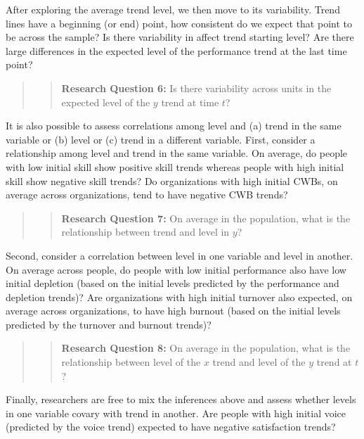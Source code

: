 \documentclass[english,,man]{apa6}
\begin{document}
After exploring the average trend level, we then move to its variability. Trend lines have a beginning (or end) point, how consistent do we expect that point to be across the sample? Is there variability in affect trend starting level? Are there large differences in the expected level of the performance trend at the last time point?

\begin{quote}
\begin{quote}
\textbf{Research Question 6:} Is there variability across units in the expected level of the \(y\) trend at time \(t\)?
\end{quote}
\end{quote}

It is also possible to assess correlations among level and (a) trend in the same variable or (b) level or (c) trend in a different variable. First, consider a relationship among level and trend in the same variable. On average, do people with low initial skill show positive skill trends whereas people with high initial skill show negative skill trends? Do organizations with high initial CWBs, on average across organizations, tend to have negative CWB trends?

\begin{quote}
\begin{quote}
\textbf{Research Question 7:} On average in the population, what is the relationship between trend and level in \(y\)?
\end{quote}
\end{quote}

Second, consider a correlation between level in one variable and level in another. On average across people, do people with low initial performance also have low initial depletion (based on the initial levels predicted by the performance and depletion trends)? Are organizations with high initial turnover also expected, on average across organizations, to have high burnout (based on the initial levels predicted by the turnover and burnout trends)?

\begin{quote}
\begin{quote}
\textbf{Research Question 8:} On average in the population, what is the relationship between level of the \(x\) trend and level of the \(y\) trend at \(t\)?
\end{quote}
\end{quote}

Finally, researchers are free to mix the inferences above and assess whether levels in one variable covary with trend in another. Are people with high initial voice (predicted by the voice trend) expected to have negative satisfaction trends?
\end{document}
